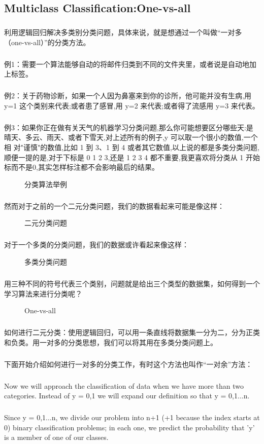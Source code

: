 \documentclass{article}
\begin{document}
\begin{CJK}{UTF8}{gbsn}
\subsection{Multiclass Classification:One-vs-all}
\subparagraph{}
利用逻辑回归解决多类别分类问题，具体来说，就是想通过一个叫做“一对多（one-vs-all）”的分类方法。
\subparagraph{}
例1：需要一个算法能够自动的将邮件归类到不同的文件夹里，或者说是自动地加上标签。
\subparagraph{}
例2：关于药物诊断，如果一个人因为鼻塞来到你的诊所，他可能并没有生病,用 y=1 这个类别来代表;或者患了感冒,用 y=2 来代表;或者得了流感用 y=3 来代表。
\subparagraph{}
例3：如果你正在做有关天气的机器学习分类问题,那么你可能想要区分哪些天:是晴天、多云、雨天、或者下雪天,对上述所有的例子,y 可以取一个很小的数值,一个相
对"谨慎"的数值,比如 1 到 3、1 到 4 或者其它数值,以上说的都是多类分类问题,顺便一提的是,对于下标是 0 1 2 3,还是 1 2 3 4 都不重要,我更喜欢将分类从 1 开始标而不是0,其实怎样标注都不会影响最后的结果。
\begin{figure}[H]
\caption{分类算法举例}
\label{fig:333}
\end{figure}
\subparagraph{}
然而对于之前的一个二元分类问题，我们的数据看起来可能是像这样：
\begin{figure}[H]
\caption{二元分类问题}
\label{fig:334}
\end{figure}
\subparagraph{}
对于一个多类的分类问题，我们的数据或许看起来像这样：
\begin{figure}[H]
\caption{多类分类问题}
\label{fig:335}
\end{figure}
\subparagraph{}
用三种不同的符号代表三个类别，问题就是给出三个类型的数据集，如何得到一个学习算法来进行分类呢？
\begin{figure}[H]
\caption{One-vs-all}
\label{fig:337}
\end{figure}
\subparagraph{}
如何进行二元分类：使用逻辑回归，可以用一条直线将数据集一分为二，分为正类和负类。用一对多的分类思想，我们可以将其用在多类分类问题上。
\subparagraph{}
下面开始介绍如何进行一对多的分类工作，有时这个方法也叫作“一对余”方法：
\subparagraph{}
Now we will approach the classification of data when we have more than two categories. Instead of y = {0,1} we will expand our definition so that y = {0,1...n}.
\subparagraph{}
Since y = {0,1...n}, we divide our problem into n+1 (+1 because the index starts at 0) binary classification problems; in each one, we predict the probability that 'y' is a member of one of our classes.

\end{CJK}
\end{document}

